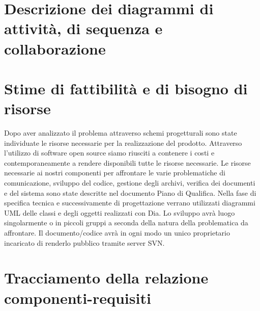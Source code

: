 \documentclass[11pt,titlepage,a4paper]{report}
\begin{document}
\chapter{Descrizione dei diagrammi di attivit\`a, di sequenza e collaborazione}%

\chapter{Stime di fattibilit\`a e di bisogno di risorse}
Dopo aver analizzato il problema attraverso schemi progetturali sono state individuate le risorse necessarie  per la realizzazione del prodotto. Attraverso l'utilizzo di software open source siamo riusciti a contenere i costi e contemporaneamente a rendere disponibili tutte le risorse necessarie.
Le risorse necessarie ai nostri componenti per affrontare le varie problematiche di comunicazione, sviluppo del codice, gestione degli archivi, verifica dei documenti e del sistema sono state descritte nel documento Piano di Qualifica. Nella fase di specifica tecnica e successivamente di progettazione verrano utilizzati diagrammi UML delle classi e degli oggetti realizzati con Dia. Lo sviluppo avr\`a luogo singolarmente o in piccoli gruppi a seconda della natura della problematica da affrontare. Il documento/codice avr\`a in ogni modo un unico proprietario incaricato di renderlo pubblico tramite server SVN.
\chapter{Tracciamento della relazione componenti-requisiti}
\end{document}
